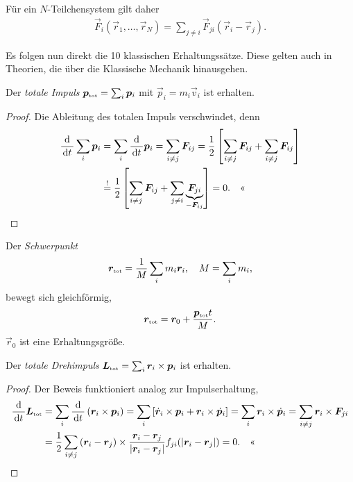 Für ein $N$-Teilchensystem gilt daher
\begin{align*}
\vec{F}_i(\vec{r}_1,\ldots,\vec{r}_N) = \sum_{j\neq i}
\vec{F}_{ji}(\vec{r}_i-\vec{r}_j).
\end{align*}

Es folgen nun direkt die 10 klassischen Erhaltungssätze. Diese gelten auch in
Theorien, die über die Klassische Mechanik hinausgehen.

\begin{prop}[Impulserhaltung]
Der \emph{totale Impuls} $\bm{p}_{\text{\tiny tot}} = \sum_i \bm{p}_i$ mit $\vec{p}_i =
m_i\vec{v}_i$ ist erhalten.\fishhere
\end{prop}
\begin{proof}
Die Ableitung des totalen Impuls verschwindet, denn
\begin{align*}
\frac{\mathrm{d}}{\,\mathrm{d} t\,}  \sum_i \bm{p}_i &= \sum_i \frac{\mathrm{d}}{\,\mathrm{d} t\,} \bm{p}_i
= \sum_{i\neq j} \bm{F}_{ij} = \frac{1}{2} \left[
\sum_{i\neq j} \bm{F}_{ij} + \sum_{i\neq j} \bm{F}_{ij} \right] \\
&\overset{!}{=} \frac{1}{2} \left[
\sum_{i\neq j} \bm{F}_{ij} + \sum_{j\neq i}
\underbrace{\bm{F}_{ji}}_{-\bm{F}_{ij}} \right]
 = 0.\quad\text{<<}
\end{align*}
\end{proof}

\begin{prop}[Schwerpunktsatz]
Der \emph{Schwerpunkt}
\begin{align*}
\bm{r}_{\text{\tiny tot}} = \frac{1}{M}\sum_i m_i \bm{r}_i,\quad M = \sum_i m_i,
\end{align*}
bewegt sich gleichförmig,
\begin{align*}
\bm{r}_{\text{\tiny tot}} = \bm{r}_0 + \frac{\bm{p}_{\text{\tiny tot}} t}{M}.
\end{align*}
$\vec{r}_0$ ist eine Erhaltungsgröße.\fishhere
\end{prop}

\begin{prop}[Drehimpulserhaltung]
Der \emph{totale Drehimpuls} $\bm{L}_{\text{\tiny tot}} = \sum_i \bm{r}_i\times \bm{p}_i$
ist erhalten.\fishhere
\end{prop}
\begin{proof}
Der Beweis funktioniert analog zur Impulserhaltung,
\begin{align*}
\frac{\mathrm{d}}{\,\mathrm{d} t\,} \bm{L}_{\text{\tiny tot}} &= \sum_i
\frac{\mathrm{d}}{\,\mathrm{d} t\,}\left(\bm{r}_i\times\bm{p}_i \right)
= \sum_i \left[\dot{\bm{r}}_i\times \bm{p}_i + \bm{r}_i \times\dot{\bm{p}}_i \right]
= \sum_i\bm{r}_i \times\dot{\bm{p}}_i = \sum_{i\neq j} \bm{r}_i\times \bm{F}_{ji}
\\ &= \frac{1}{2} \sum_{i\neq j} \left(\bm{r}_i-\bm{r}_j\right)\times
\frac{\bm{r}_i-\bm{r}_j}{\left|\bm{r}_i-\bm{r}_j\right|}
f_{ji}(\left|\bm{r}_i-\bm{r}_j\right|) = 0.\quad\text{<<}
\end{align*}
\end{proof}


